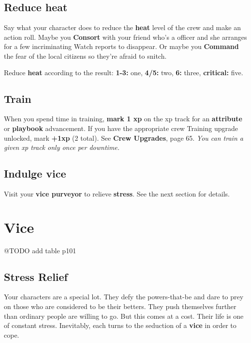 \documentclass[11pt,fleqn,a5paper]{book}
\newcommand{\gameterm}[1]{\textbf{#1}}
\begin{document}
\section{Reduce heat}

Say what your character does to reduce the \gameterm{heat}  level of the crew and make an action roll. Maybe you \gameterm{Consort}  with your friend who’s a officer and she arranges for a few incriminating Watch reports to disappear. Or maybe you \gameterm{Command}  the fear of the local citizens so they’re afraid to snitch.

Reduce \gameterm{heat}  according to the result: \gameterm{1-3:}  one, \gameterm{4/5:}  two, \gameterm{6:}  three, \gameterm{critical:}  five.

\section{Train}

When you spend time in training,\textbf{ mark 1 xp} on the xp track for an \textbf{attribute} or \textbf{playbook }advancement. If you have the appropriate crew Training upgrade unlocked, mark \textbf{+1}\textbf{xp} (2 total). See \textbf{Crew Upgrades}, page 65. \emph{You can train a given xp track only once per downtime.}

\section{Indulge vice}

Visit your \textbf{vice purveyor} to relieve \textbf{stress}. See the next section for details.

\chapter{Vice}

@TODO add table p101

\section{Stress Relief}

Your characters are a special lot. They defy the powers-that-be and dare to prey on those who are considered to be their betters. They push themselves further than ordinary people are willing to go. But this comes at a cost. Their life is one of constant stress. Inevitably, each turns to the seduction of a \textbf{vice} in order to cope.
\end{document}
